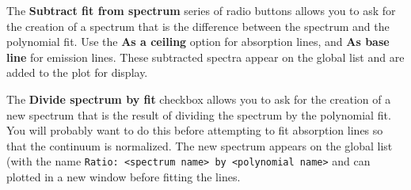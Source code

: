 \documentclass[twoside,11pt]{article}
\renewcommand{\_}{\texttt{\symbol{95}}}
\newcommand{\labelitem}[1]{\textbf{#1}}
\newcommand{\hitext}[1]{\texttt{#1}}
\begin{document}
The \labelitem{Subtract fit from spectrum} series of radio buttons
allows you to ask for the creation of a spectrum that is the difference
between the spectrum and the polynomial fit. Use the \labelitem{As a
ceiling} option for absorption lines, and \labelitem{As base line} for
emission lines. These subtracted spectra appear on the global list and
are added to the plot for display.

The \labelitem{Divide spectrum by fit} checkbox allows you to ask for
the creation of a new spectrum that is the result of dividing the
spectrum by the polynomial fit. You will probably want to do this
before attempting to fit absorption lines so that the continuum is
normalized. The new spectrum appears on the global list (with the
name \hitext{Ratio: <spectrum name> by <polynomial name>} and can
plotted in a new window before fitting the lines.
\end{document}
